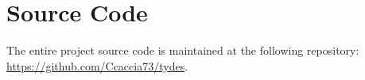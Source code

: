% 
%       
% 
%       
% 
%       

\vspace{0.5cm}

\section{Source Code}
The entire project source code is maintained at the following repository:\\
\url{https://github.com/Ccaccia73/tydes}.